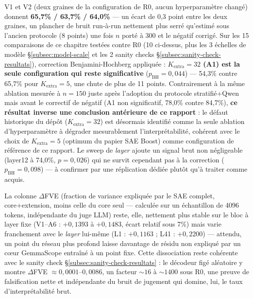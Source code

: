 \documentclass[11pt]{article}
\begin{document}
\begin{resultbox}
V1 et V2 (deux graines de la configuration de R0, aucun hyperparamètre
changé) donnent \textbf{65,7\% / 63,7\% / 64,0\%} --- un écart de 0,3 point
entre les deux graines, un plancher de bruit run-à-run nettement plus serré
qu'estimé sous l'ancien protocole (8 points) une fois $n$ porté à 300 et le
négatif corrigé. Sur les 15 comparaisons de ce chapitre testées contre R0
(10 ci-dessus, plus les 3 échelles de modèle \S\ref{subsec:model-scale} et
les 2 sanity checks \S\ref{subsec:sanity-check-resultats}), correction
Benjamini-Hochberg appliquée : \textbf{$K_\text{extra}=32$ (A1) est la seule
configuration qui reste significative} ($p_\text{BH}=0{,}044$) --- 54,3\%
contre 65,7\% pour $K_\text{extra}=5$, une chute de plus de 11 points.
Contrairement à la même ablation mesurée à $n=150$ juste après l'adoption du
protocole stratifié+Qwen mais avant le correctif de négatif (A1 non
significatif, 78,0\% contre 84,7\%), \textbf{ce résultat
inverse une conclusion antérieure de ce rapport} : le défaut historique du
dépôt ($K_\text{extra}=32$) est désormais identifié comme la seule ablation
d'hyperparamètre à dégrader mesurablement l'interprétabilité, cohérent avec
le choix de $K_\text{extra}=5$ (optimum du papier SAE Boost) comme
configuration de référence de ce rapport. Le sweep de \emph{layer} ajoute un
signal brut non négligeable (layer12 à 74,0\%, $p=0{,}026$) qui ne survit
cependant pas à la correction ($p_\text{BH}=0{,}098$) --- à confirmer par une
réplication dédiée plutôt qu'à traiter comme acquis.

La colonne $\Delta$FVE (fraction de variance expliquée par le SAE complet,
core+extension, moins celle du core seul --- calculée sur un échantillon de
4096 tokens, indépendante du juge LLM) reste, elle, nettement plus stable sur
le bloc à layer fixe (V1--A6 : $+0{,}1393$ à $+0{,}1483$, écart relatif sous
7\%) mais varie franchement avec le \emph{layer} lui-même (L1 : $+0{,}1163$ ;
L41 : $+0{,}2200$) --- attendu, un point du réseau plus profond laisse
davantage de résidu non expliqué par un cœur GemmaScope entraîné à un point
fixe. Cette dissociation reste cohérente avec le sanity check
\S\ref{subsec:sanity-check-resultats} : le décodeur figé aléatoire y montre
$\Delta$FVE $\approx 0{,}0001$--$0{,}0086$, un facteur ${\sim}16$ à
${\sim}1400$ sous R0, une preuve de falsification nette et indépendante du
bruit de jugement qui domine, lui, le taux d'interprétabilité brut.


\end{resultbox}
\end{document}
